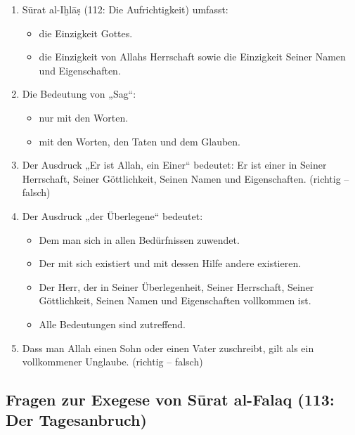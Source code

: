 \begin{enumerate}[leftmargin=1.6em,resume]
  Einzigkeit Allahs verinnerlicht. (richtig -- falsch)
\item Sūrat al-Iḫlāṣ (112: Die Aufrichtigkeit) umfasst:
  \begin{itemize}
    \item die Einzigkeit Gottes.
    \item die Einzigkeit von Allahs Herrschaft sowie die Einzigkeit Seiner Namen und
      Eigenschaften.
  \end{itemize}
\item Die Bedeutung von „Sag“:
  \begin{itemize}
    \item nur mit den Worten.
    \item mit den Worten, den Taten und dem Glauben.
  \end{itemize}
\item Der Ausdruck „Er ist Allah, ein Einer“ bedeutet: Er ist einer in Seiner Herrschaft, Seiner
  Göttlichkeit, Seinen Namen und Eigenschaften. (richtig -- falsch)
\item Der Ausdruck „der Überlegene“ bedeutet:
  \begin{itemize}
    \item Dem man sich in allen Bedürfnissen zuwendet.
    \item Der mit sich existiert und mit dessen Hilfe andere existieren.
    \item Der Herr, der in Seiner Überlegenheit, Seiner Herrschaft, Seiner Göttlichkeit, Seinen
      Namen und Eigenschaften vollkommen ist.
    \item Alle Bedeutungen sind zutreffend.
  \end{itemize}
\item Dass man Allah einen Sohn oder einen Vater zuschreibt, gilt als ein vollkommener
  Unglaube. (richtig -- falsch)
\end{enumerate}

\subsection*{Fragen zur Exegese von Sūrat al-Falaq (113: Der Tagesanbruch)}

